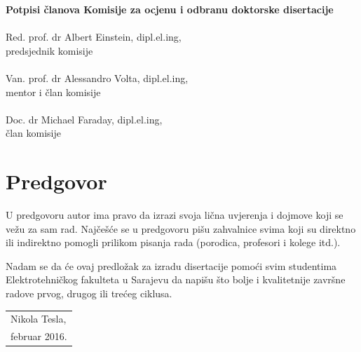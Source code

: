 \documentclass[12pt,oneside, a4paper]{book}
\begin{document}
\pagebreak
\thispagestyle{plain}
\vspace{2cm}
\begin{center}
\textbf{\Large Potpisi članova Komisije za ocjenu i odbranu doktorske disertacije}\\


\vspace{4cm}
\makebox[10cm]{\hrulefill} \\
Red. prof. dr Albert Einstein, dipl.el.ing, \\
predsjednik komisije\\

\vspace{3cm}
\makebox[10cm]{\hrulefill} \\
Van. prof. dr Alessandro Volta, dipl.el.ing, \\
mentor i član komisije\\

\vspace{3cm}
\makebox[10cm]{\hrulefill} \\
Doc. dr Michael Faraday, dipl.el.ing, \\
član komisije

\end{center}


\chapter*{Predgovor}

U predgovoru autor ima pravo da izrazi svoja lična uvjerenja i dojmove koji se vežu za sam rad. Najčešće se u predgovoru pišu zahvalnice svima koji su direktno ili indirektno pomogli prilikom pisanja rada (porodica, profesori i kolege itd.). 

Nadam se da će ovaj predložak za izradu disertacije pomoći svim studentima Elektrotehničkog fakulteta u Sarajevu da napišu što bolje i kvalitetnije završne radove prvog, drugog ili trećeg ciklusa.

\vspace{1cm}
\begin{flushright}
\begin{tabular}{m{6cm}}
Nikola Tesla,\\
februar 2016.
\end{tabular}
\end{flushright}


\end{document}
